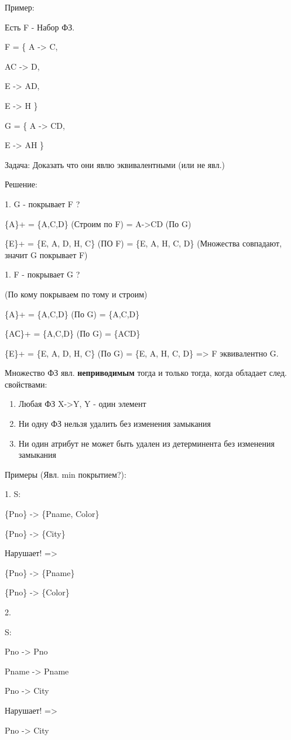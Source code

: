 Пример:

Есть F - Набор ФЗ.

F = \{
A -> C,

AC -> D,

E -> AD,

E -> H
\}

G = \{
A -> CD,

E -> AH
\}

Задача: Доказать что они явлю эквивалентными (или не явл.)

Решение:

1. G - покрывает F ?

\{A\}+ = \{A,C,D\} (Строим по F) = A->CD (По G)

\{E\}+ = \{E, A, D, H, C\} (ПО F) = \{E, A, H, C, D\} (Множества совпадают, значит G покрывает F)

1. F - покрывает G ?

(По кому покрываем по тому и строим)

\{A\}+ = \{A,C,D\} (По G) = \{A,C,D\}

\{AС\}+ = \{A,C,D\} (По G) = \{ACD\}

\{E\}+ = \{E, A, D, H, C\} (По G) = \{E, A, H, C, D\} => F эквивалентно G.

Множество ФЗ явл. \textbf{неприводимым} тогда и только тогда, когда обладает след. свойствами:

\begin{enumerate}
	\item Любая ФЗ X->Y, Y - один элемент
	\item Ни одну ФЗ нельзя удалить без изменения замыкания
	\item Ни один атрибут не может быть удален из детерминента без изменения замыкания
\end{enumerate}

Примеры (Явл. min покрытием?):

1. S:

\{Pno\} -> \{Pname, Color\}

\{Pno\} -> \{City\}

Нарушает! =>

\{Pno\} -> \{Pname\}

\{Pno\} -> \{Color\}

2.

S:

Pno -> Pno

Pname -> Pname

Pno -> City

Нарушает! =>

Pno -> City

